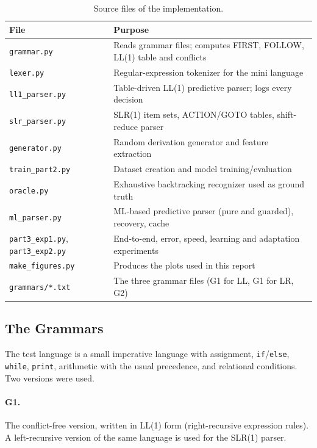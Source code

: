 \documentclass[12pt,a4paper]{article}
\newcommand{\tok}[1]{\texttt{#1}}
\begin{document}
\begin{table}[H]
\centering
\caption{Source files of the implementation.}
\label{tab:files}
\small
\begin{tabularx}{\textwidth}{lX}
\toprule
\textbf{File} & \textbf{Purpose}\\
\midrule
\texttt{grammar.py} & Reads grammar files; computes FIRST, FOLLOW, LL(1) table and conflicts\\
\texttt{lexer.py} & Regular-expression tokenizer for the mini language\\
\texttt{ll1\_parser.py} & Table-driven LL(1) predictive parser; logs every decision\\
\texttt{slr\_parser.py} & SLR(1) item sets, ACTION/GOTO tables, shift-reduce parser\\
\texttt{generator.py} & Random derivation generator and feature extraction\\
\texttt{train\_part2.py} & Dataset creation and model training/evaluation\\
\texttt{oracle.py} & Exhaustive backtracking recognizer used as ground truth\\
\texttt{ml\_parser.py} & ML-based predictive parser (pure and guarded), recovery, cache\\
\texttt{part3\_exp1.py}, \texttt{part3\_exp2.py} & End-to-end, error, speed, learning and adaptation experiments\\
\texttt{make\_figures.py} & Produces the plots used in this report\\
\texttt{grammars/*.txt} & The three grammar files (G1 for LL, G1 for LR, G2)\\
\bottomrule
\end{tabularx}
\end{table}

\subsection{The Grammars}

The test language is a small imperative language with assignment, \tok{if}/\tok{else},
\tok{while}, \tok{print}, arithmetic with the usual precedence, and relational
conditions. Two versions were used.

\paragraph{G1.} The conflict-free version, written in LL(1) form (right-recursive
expression rules). A left-recursive version of the same language is used for the
SLR(1) parser.
\end{document}
